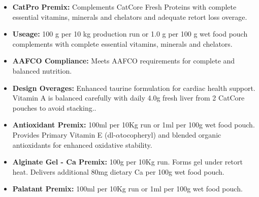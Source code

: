 \vspace{1em}

\begin{itemize}
\item \textbf{CatPro Premix: } Complements CatCore Fresh Proteins with complete essential vitamins, minerals and chelators and adequate retort loss overage.
\item \textbf{Useage:} 100 g per 10 kg production run or 1.0 g per 100 g wet food pouch complements with complete essential vitamins, minerals and chelators. \item\textbf{AAFCO Compliance: } Meets AAFCO requirements for complete and balanced nutrition.
\item\textbf{Design Overages: }Enhanced taurine formulation for cardiac health support. Vitamin A is balanced carefully with daily 4.0g fresh liver from 2 CatCore pouches to avoid stacking.\cite{ref64}.  
\item \textbf{Antioxidant Premix: } 100ml per 10Kg run or 1ml per 100g wet food pouch. Provides Primary Vitamin E (dl-$\alpha$tocopheryl) and blended organic antioxidants for enhanced oxidative stability.
\item \textbf{Alginate Gel - Ca Premix:} 100g per 10Kg run. Forms gel under retort heat. Delivers additional 80mg dietary Ca per 100g wet food pouch.
\item \textbf{Palatant Premix: } 100ml per 10Kg run or 1ml per 100g wet food pouch.
\end{itemize}
